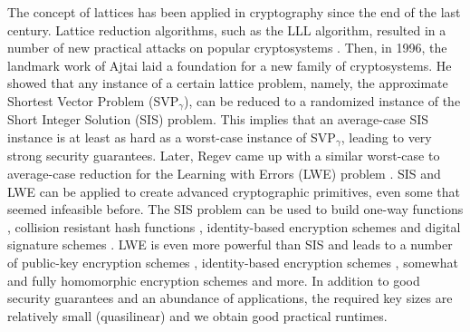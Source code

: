 \documentclass[
  a4paper,  %
  twoside,  %
  bibliography=totoc,
  headsepline,
  cleardoublepage=empty,
  parskip=half,
  draft=false
]{scrbook}
\begin{document}
The concept of lattices has been applied in cryptography since the end of the last century. Lattice reduction algorithms, such as the LLL algorithm, resulted in a number of new practical attacks on popular cryptosystems \cite{NV10}. Then, in 1996, the landmark work of Ajtai \cite{Ajt96} laid a foundation for a new family of cryptosystems. He showed that any instance of a certain lattice problem, namely, the approximate Shortest Vector Problem (SVP$_\gamma$), can be reduced to a randomized instance of the Short Integer Solution (SIS) problem. This implies that an average-case SIS instance is at least as hard as a worst-case instance of SVP$_\gamma$, leading to very strong security guarantees. Later, Regev came up with a similar worst-case to average-case reduction for the Learning with Errors (LWE) problem \cite{Reg05}. SIS and LWE can be applied to create advanced cryptographic primitives, even some that seemed infeasible before. The SIS problem can be used to build one-way functions \cite{Ajt96, MR04}, collision resistant hash functions \cite{GGH96}, identity-based encryption schemes \cite{Lyu08} and digital signature schemes \cite{LM08, GPV08}. LWE is even more powerful than SIS and leads to a number of public-key encryption schemes \cite{Reg05, PW08, LPR10}, identity-based encryption schemes \cite{GPV08, ABB10}, somewhat and fully homomorphic encryption schemes \cite{Gen09a,BV11,GSW13} and more.
In addition to good security guarantees and an abundance of applications, the required key sizes are relatively small (quasilinear) and we obtain good practical runtimes.

%

\end{document}
